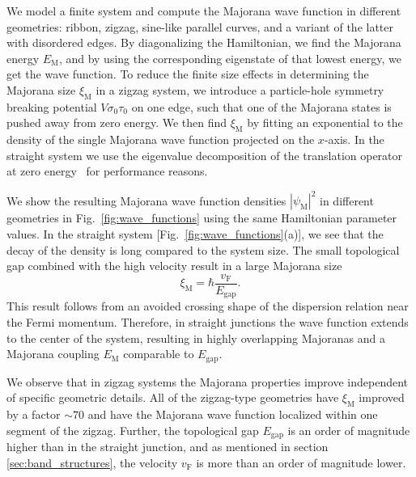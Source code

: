 \documentclass[english, twocolumn, 10pt, aps, superscriptaddress, floatfix, prb, citeautoscript]{revtex4-1}
\renewcommand{\comment}[2]{#2}
\begin{document}
\comment{We calculate the wave functions and find the Majorana lengths by fitting an exponential.}
We model a finite system and compute the Majorana wave function in different geometries: ribbon, zigzag, sine-like parallel curves, and a variant of the latter with disordered edges.
By diagonalizing the Hamiltonian, we find the Majorana energy $E_\textrm{M}$, and by using the corresponding eigenstate of that lowest energy, we get the wave function.
To reduce the finite size effects in determining the Majorana size $\xi_\textrm{M}$ in a zigzag system, we introduce a particle-hole symmetry breaking potential $V \sigma_0 \tau_0$ on one edge, such that one of the Majorana states is pushed away from zero energy.
We then find $\xi_\textrm{M}$ by fitting an exponential to the density of the single Majorana wave function projected on the $x$-axis.
In the straight system we use the eigenvalue decomposition of the translation operator at zero energy~\cite{Nijholt2016} for performance reasons.

\comment{In a straight system, the Majoranas are very poorly localized because of small gap and high velocity}
We show the resulting Majorana wave function densities $\left| \psi_\textrm{M} \right|^2$ in different geometries in Fig.~\ref{fig:wave_functions} using the same Hamiltonian parameter values.
In the straight system [Fig.~\ref{fig:wave_functions}(a)], we see that the decay of the density is long compared to the system size.
The small topological gap combined with the high velocity result in a large Majorana size
\begin{equation}
\label{eq:xi_M}
\xi_\textrm{M}=\hbar \frac{v_\textrm{F}}{E_\textrm{gap}}.
\end{equation}
This result follows from an avoided crossing shape of the dispersion relation near the Fermi momentum.
Therefore, in straight junctions the wave function extends to the center of the system, resulting in highly overlapping Majoranas and a Majorana coupling $E_\textrm{M}$ comparable to $E_\textrm{gap}$.

\comment{In a zigzag geometry Majoranas are localized within one segment of zigzag independent of details}
We observe that in zigzag systems the Majorana properties improve independent of specific geometric details.
All of the zigzag-type geometries have $\xi_\textrm{M}$ improved by a factor $\sim 70$ and have the Majorana wave function localized within one segment of the zigzag.
Further, the topological gap $E_\textrm{gap}$ is an order of magnitude higher than in the straight junction, and as mentioned in section \ref{sec:band_structures}, the velocity $v_\textrm{F}$ is more than an order of magnitude lower.
\end{document}

